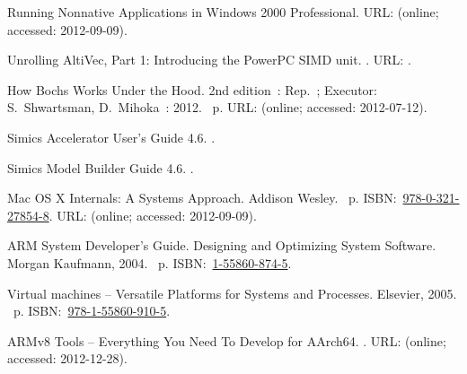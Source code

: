 \begin{thebibliography}{10}
Running Nonnative Applications in Windows 2000 Professional. \BibDash
\newblock URL:
  (online; accessed: 2012-09-09).

 {Unrolling {AltiVec}, Part 1: Introducing the {PowerPC}
  {SIMD} unit}. \BibDash
{}. \BibDash
\newblock URL:
  .

How {Bochs} Works Under the Hood. 2nd edition~: Rep.~; Executor: S.~Shwartsman,
  D.~Mihoka~: 2012. \BibDash
{}~p. URL:  (online; accessed: 2012-07-12).

{{Simics} {Accelerator} User’s Guide 4.6}. \BibDash
{}.

{{Simics} {Model} {Builder} Guide 4.6}. \BibDash
{}.

 Mac {OS} {X} Internals: A Systems Approach. \BibDash
\newblock Addison Wesley. \BibDash
{}~p. \BibDash
\newblock
  ISBN:~\href{http://isbndb.com/search-all.html?kw=978-0-321-27854-8}{978-0-321-27854-8}.
  \BibDash
\newblock URL:  (online; accessed: 2012-09-09).

 {ARM} System Developer’s Guide.
  Designing and Optimizing System Software. \BibDash
\newblock Morgan Kaufmann, 2004. \BibDash
{}~p. \BibDash
\newblock
  ISBN:~\href{http://isbndb.com/search-all.html?kw=1-55860-874-5}{1-55860-874-5}.

 {Virtual machines -- Versatile Platforms for
  Systems and Processes}. \BibDash
\newblock Elsevier, 2005. \BibDash
{}~p. \BibDash
\newblock
  ISBN:~\href{http://isbndb.com/search-all.html?kw=978-1-55860-910-5}{978-1-55860-910-5}.

 {ARMv8} Tools -- Everything You Need To Develop for
  {AArch64}. \BibDash
{}. \BibDash
\newblock URL:
  (online; accessed: 2012-12-28).


\end{thebibliography}
